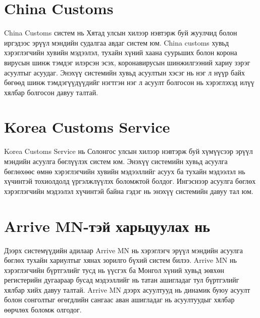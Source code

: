 \section{China Customs} 
China Customs систем нь Хятад улсын хилээр нэвтэрж буй жуулчид болон иргэдээс эрүүл мэндийн судалгаа авдаг систем юм. China customs хувьд хэрэглэгчийн хувийн мэдээлэл, тухайн хүний хаана суурьших болон корона вирусын шинж тэмдэг илэрсэн эсэх, коронавирусын шинжилгээний хариу зэрэг асуултыг асуудаг. Энэхүү системийн хувьд асуултын хэсэг нь нэг л нүүр байх бөгөөд шинж тэмдэгүүдүүдийг нэгтгэн нэг л асуулт болгосон нь хэрэглэхэд илүү хялбар болгосон давуу талтай. 

\section{Korea Customs Service} 
Korea Customs Service нь Солонгос улсын хилээр нэвтэрж буй хүмүүсээр эрүүл мэндийн асуулга бөглүүлэх систем юм. Энэхүү системийн хувьд асуулга бөглөхөөс өмнө хэрэглэгчийн хувийн мэдээллийг асуух ба тухайн мэдээлэл нь хүчинтэй тохиолдолд үргэлжлүүлэх боломжтой болдог.
Ингэснээр асуулга бөглөх хэрэглэгчийн мэдээлэл хүчинтэй байна гэдэг нь энэхүү системийн давуу тал юм. 

\section{Arrive MN-тэй харьцуулах нь}
Дээрх системүүдийн адилаар Arrive MN нь хэрэглэгч эрүүл мэндийн асуулга бөглөх тухайн хариултыг хянах зорилго бүхий систем билээ. Arrive MN нь хэрэглэгчийн бүртгэлийг тусд нь үүсгэх ба Монгол хүний хувьд зөвхөн регистерийн дугаараар бусад мэдээллийг нь татан ашигладаг тул бүртгэлийг хялбар хийх давуу талтай. Arrive MN дээрх асуултууд нь динамик буюу асуулт болон сонголтыг өгөгдлийн сангаас аван ашигладаг нь асуултуудыг хялбар өөрчлөх боломж олгодог. 
